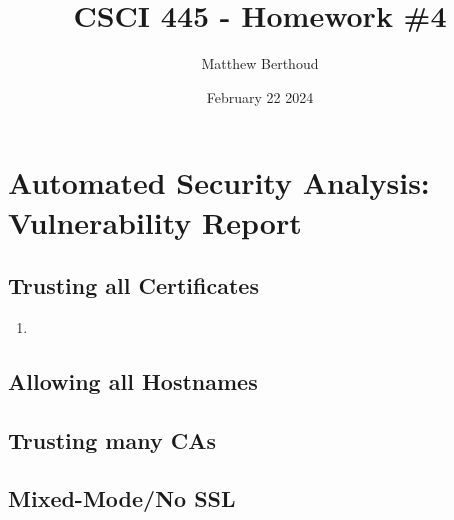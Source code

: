 \documentclass[11pt]{article}
\title{CSCI 445 - Homework \#4}
\author{Matthew Berthoud}
\date{February 22 2024}
\begin{document}
\maketitle

\section{Automated Security Analysis: Vulnerability Report}

\subsection{Trusting all Certificates}
\begin{enumerate}
    \item
\end{enumerate}

\subsection{Allowing all Hostnames}
\subsection{Trusting many CAs}
\subsection{Mixed-Mode/No SSL}
\end{document}
